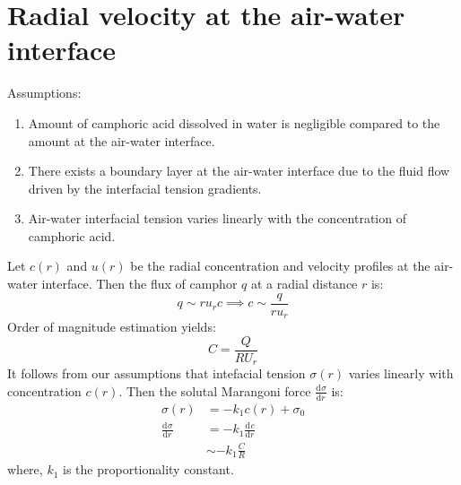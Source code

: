 \documentclass[journal=langd5, manuscript=article, layout=twocolumn]{achemso}
\newcommand{\tdc}[3][]{\frac{\mathrm{d}^{#1}#2}{\mathrm{d}#3^{#1}}} %
\begin{document}





\newpage
\appendix
{}
\section{Radial velocity at the air-water interface}
\label{app:uvsr}
Assumptions:
\begin{enumerate}
\item Amount of camphoric acid dissolved in water is negligible compared to the amount at the air-water interface.
\item There exists a boundary layer at the air-water interface due to the fluid flow driven by the interfacial tension gradients.
\item Air-water interfacial tension varies linearly with the concentration of camphoric acid.
\end{enumerate}
Let $c(r)$ and $u(r)$ be the radial concentration and velocity profiles at the air-water interface. 
Then the flux of camphor $q$ at a radial distance $r$ is: 
\begin{equation*}
q \sim r u_{r} c \implies c \sim \frac{q}{ru_{r}} 
\end{equation*}
Order of magnitude estimation yields:
\begin{equation}\label{eq:massbal}
C = \frac{Q}{RU_{r}}
\end{equation}
It follows from our assumptions that intefacial tension $\sigma (r)$ varies linearly with concentration $c(r)$. Then the solutal Marangoni force $\tdc{\sigma}{r}$ is:
\begin{align}\label{eq:sigmavsconc}
\sigma (r) &= -k_{1} c(r) + \sigma_{0} \nonumber \\ 
\tdc{\sigma}{r} &= -k_{1}\tdc{c}{r} \nonumber \\ 
&\sim -k_{1} \frac{C}{R}
\end{align}
where, $k_{1}$ is the proportionality constant. 
\end{document}
